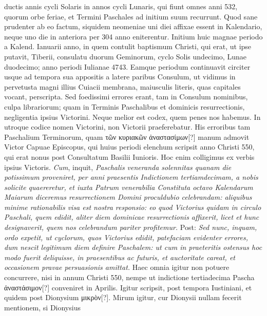 ductis annis cycli Solaris in annos cycli Lunaris, qui fiunt
omnes anni 532, quorum orbe feriae, et Termini Paschales ad initium
suum recurrunt.
Quod sane prudenter ab eo factum, siquidem
neomeniae uni diei affixae essent in Kalendario, neque uno die
in anteriora per 304 anno eniterentur.
Initium huic magnae periodo
a Kalend. Ianuarii anno, in quem contulit baptismum Christi,
qui erat, ut ipse putavit,  Tiberii, consulatu duorum Geminorum,
cyclo Solis undecimo, Lunae duodecimo; anno periodi Iulianae
4743.
Eamque periodum continuavit circiter usque ad tempora
sua appositis a latere paribus Consulum, ut vidimus in pervetusta
magni illius Cuiacii membrana, maiusculis literis, quas capitales vocant,
perscripta.
Sed foedissimi errores erant, tam in Consulum nominibus,
culpa librariorum; quam in Terminis Paschalibus et dominicis
resurrectionis, negligentia ipsius Victorini.
Neque melior est
codex, quem penes nos habemus.
In utroque codice nomen Victorini,
non Victorii praeferebatur.
His erroribus tam Paschalium
Terminorum, quam \textgreek{τῶν κυριακῶν ἀναστασίμων[?]} manum admovit Victor
Capuae Episcopus, qui huius periodi elenchum scripsit anno
Christi 550, qui erat nonus post Consultatum Basilii Iunioris.
Hoc
enim colligimus ex verbis ipsius Victoris.
\textit{Cum}, inquit, \textit{Paschalis
veneranda solennitas quanam die potissimum proveniret, per anni praesentis
Indictionem tertiamdecimam, a nobis solicite quaereretur, et
iuxta Patrum venerabilia Constituta octavo Kalendarum Maiarum
diceremus resurrectionem Domini proculdubio celebrandam: aliquibus
minime rationabilis visa est nostra responsio: eo quod Victorius quidam
in circulo Paschali, quem edidit, aliter diem dominicae resurrectionis
affixerit, licet et hunc designaverit, quem nos celebrandum pariter
profitemur.}
Post: \textit{Sed nunc, inquam, ordo expetit, ut cyclorum, quos
Victorius edidit, patefaciam evidenter errores, dum nescit legitimum
diem definire Paschalem: ut cum in praeteritis ostensus hoc modo fuerit
deliquisse, in praesentibus ac futuris, et auctoritate careat, et occasionem
pravae persuasionis amittat.}
%
Haec omnia igitur non potuere
concurrere, nisi in annum Christi 550, nempe ut indictione tertiadecima
Pascha \textgreek{ἀναστάσιμον[?]} conveniret in  Aprilis.
Igitur scripsit,
post tempora Iustiniani, et quidem post Dionysium \textgreek{μικρὸν[?]}.
Mirum
igitur, cur Dionysii nullam fecerit mentionem, si Dionysius
